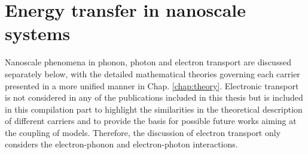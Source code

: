 \section{Energy transfer in nanoscale systems}
Nanoscale phenomena in phonon, photon and electron transport are discussed separately below, with the detailed mathematical theories governing each carrier presented in a more unified manner in Chap. \ref{chap:theory}. Electronic transport is not considered in any of the publications included in this thesis but is included in this compilation part to highlight the similarities in the theoretical description of different carriers and to provide the basis for possible future works aiming at the coupling of models. Therefore, the discussion of electron transport only considers the electron-phonon and electron-photon interactions.  %



